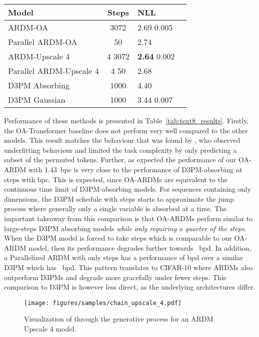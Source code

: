 \documentclass{article} \usepackage{iclr2022_conference,times}
\begin{document}
\begin{table}
\begin{minipage}[t]{.47\textwidth}
\begin{table}[H]
{\begin{tabular}{l c l l}
    \toprule
    Model & Steps & NLL \\ \midrule
       ARDM-OA & 3072 & 2.69 {\scriptsize 0.005} \\
       Parallel ARDM-OA & 50 & 2.74 \\ \midrule
       ARDM-Upscale 4 & 4  3072 & \textbf{2.64} {\scriptsize 0.002} \\  
       Parallel ARDM-Upscale 4 & 4  50 & 2.68 \\ \midrule
       D3PM Absorbing & 1000 & 4.40 \\
       D3PM Gaussian & 1000 & 3.44 {\scriptsize 0.007}\\ \bottomrule
    \end{tabular}}
\end{table}
\end{minipage}
\vspace{-.45cm} \end{table}

Performance of these methods is presented in Table~\ref{tab:text8_results}. Firstly, the OA-Transformer baseline does not perform very well compared to the other models. This result matches the behaviour that was found by \citet{yang2019xlnet}, who observed underfitting behaviour and limited the task complexity by only predicting a subset of the permuted tokens. Further, as expected the performance of our OA-ARDM with 1.43~bpc is very close to the performance of D3PM-absorbing at  steps with  bpc. This is expected, since OA-ARDMs are equivalent to the continuous time limit of D3PM-absorbing models. For sequences containing only  dimensions, the D3PM schedule with  steps starts to approximate the jump process where generally only a single variable is absorbed at a time. The important takeaway from this comparison is that OA-ARDMs perform similar to large-steps D3PM absorbing models \textit{while only requiring a quarter of the steps}. When the D3PM model is forced to take  steps which is comparable to our OA-ARDM model, then its performance degrades further towards ~bpd. In addition, a Parallelized ARDM with only  steps has a performance of  bpd over a similar D3PM which has ~bpd. This pattern translates to CIFAR-10 \citep{krizhevsky2009learning} where ARDMs also outperform D3PMs and degrade more gracefully under fewer steps. This comparison to D3PM is however less direct, as the underlying architectures differ.

\begin{figure}
    \centering
    \vspace{-.2cm}
    \texttt{[image: figures/samples/chain\_upscale\_4.pdf]}
    \vspace{-.65cm}
    \caption{Visualization of  through the generative process for an ARDM Upscale 4 model.}
    \label{fig:chain}
    \vspace{-.5cm}
\end{figure}
\end{document}
